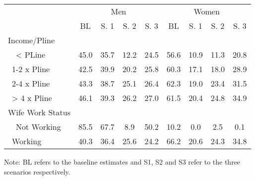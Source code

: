 \begin{tabular}{l*{8}{c}}
\hline\hline
          & \multicolumn{4}{c}{Men} & \multicolumn{4}{c}{Women} \\  \cline{2-5} \cline{6-9}
            &    BL&  S. 1&  S. 2&  S. 3&    BL&  S. 1&  S. 2&  S. 3\\
Income/Pline   & \multicolumn{8}{c}{} \\ 
\ \ < PLine &        45.0&        35.7&        12.2&        24.5&        56.6&        10.9&        11.3&        20.8\\
\ 1-2 x Pline&        42.5&        39.9&        20.2&        25.8&        60.3&        17.1&        18.0&        28.9\\
\ 2-4 x Pline&        43.3&        38.7&        25.1&        26.4&        62.3&        19.0&        23.4&        31.5\\
\ > 4 x Pline&        46.1&        39.3&        26.2&        27.0&        61.5&        20.4&        24.8&        34.9\\

\midrule

Wife Work Status   & \multicolumn{8}{c}{} \\ 
\ \ Not Working&        85.5&        67.7&         8.9&        50.2&        10.2&         0.0&         2.5&         0.1\\
\ Working   &           40.3&        36.4&        25.6&        24.2&        66.2&        20.6&        24.3&        34.8\\
\hline\hline
\end{tabular}
\footnotesize Note: BL refers to the baseline estimates and S1, S2 and S3 refer to the three scenarios respectively.

